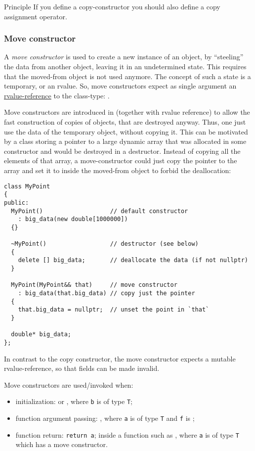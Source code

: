 \begin{guideline}{Principle}
  If you define a copy-constructor you should also define a copy assignment operator.
\end{guideline}


\subsubsection{Move constructor}
A \emph{move constructor}\marginpar{[\cxx{11}]} is used to create a new instance of an object, by ``steeling'' the data from another object,
leaving it in an undetermined state. This requires that the moved-from object is not used anymore. The concept of such a state is a temporary, or
an rvalue. So, move constructors expect as single argument an \underline{rvalue-reference} to the class-type: .

Move constructors are introduced in  (together with rvalue reference) to allow the fast construction of copies of objects, that are destroyed anyway.
Thus, one just use the data of the temporary object, without copying it. This can be motivated by a class storing a pointer to a large dynamic array
that was allocated in some constructor and would be destroyed in a destructor. Instead of copying all the elements of that array, a move-constructor
could just copy the pointer to the array and set it to  inside the moved-from object to forbid the deallocation:
%
\begin{verbatim}
class MyPoint
{
public:
  MyPoint()                   // default constructor
    : big_data(new double[1000000])
  {}

  ~MyPoint()                  // destructor (see below)
  {
    delete [] big_data;       // deallocate the data (if not nullptr)
  }

  MyPoint(MyPoint&& that)     // move constructor
    : big_data(that.big_data) // copy just the pointer
  {
    that.big_data = nullptr;  // unset the point in `that`
  }

  double* big_data;
};
\end{verbatim}
%
In contrast to the copy constructor, the move constructor expects a mutable rvalue-reference, so that fields can be made invalid.

Move constructors are used/invoked when:
\begin{itemize}
  \item initialization:  or , where \texttt{b} is of type \texttt{T};
  \item function argument passing: , where \texttt{a} is of type \texttt{T} and \texttt{f} is ;
  \item function return: \texttt{return a}; inside a function such as , where \texttt{a} is of type \texttt{T} which has a move constructor.
\end{itemize}

